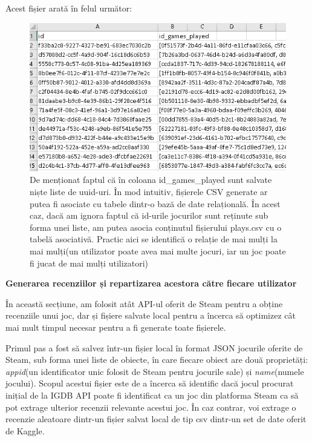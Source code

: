 \documentclass[12pt,a4paper]{report}
\begin{document}
Acest fișier arată în felul următor:

\begin{figure}[H]
\centering
\caption{}
\includegraphics[scale = 0.8]{exemplu_12_plays}
\caption*{De menționat faptul că în coloana id\_games\_played sunt salvate niște liste de uuid-uri. În mod intuitiv, fișierele CSV generate ar putea fi asociate cu tabele dintr-o bază de date relațională. În acest caz, dacă am ignora faptul că id-urile jocurilor sunt reținute sub forma unei liste, am putea asocia conținutul fișierului plays.csv cu o tabelă asociativă. Practic aici se identifică o relație de mai mulți la mai mulți(un utilizator poate avea mai multe jocuri, iar un joc poate fi jucat de mai mulți utilizatori) }
\end{figure}

\bigskip
\textbf{Generarea recenziilor și repartizarea acestora către fiecare utilizator}
\bigskip

În această secțiune, am folosit atât API-ul oferit de Steam pentru a obține recenziile unui joc, dar și fișiere salvate local pentru a încerca să optimizez cât mai mult timpul necesar pentru a fi generate toate fișierele.

Primul pas a fost să salvez într-un fișier local în format JSON jocurile oferite de Steam, sub forma unei liste de obiecte, în care fiecare obiect are două proprietăți:  \emph{appid}(un identificator unic folosit de Steam pentru jocurile sale) și \emph{name}(numele jocului). Scopul acestui fișier este de a încerca să identific dacă jocul procurat inițial de la IGDB API poate fi identificat ca un joc din platforma Steam ca să pot extrage ulterior recenzii relevante acestui joc. În caz contrar, voi extrage o recenzie aleatoare dintr-un fișier salvat local de tip csv dintr-un set de date oferit de Kaggle. \cite{17}
\end{document}
